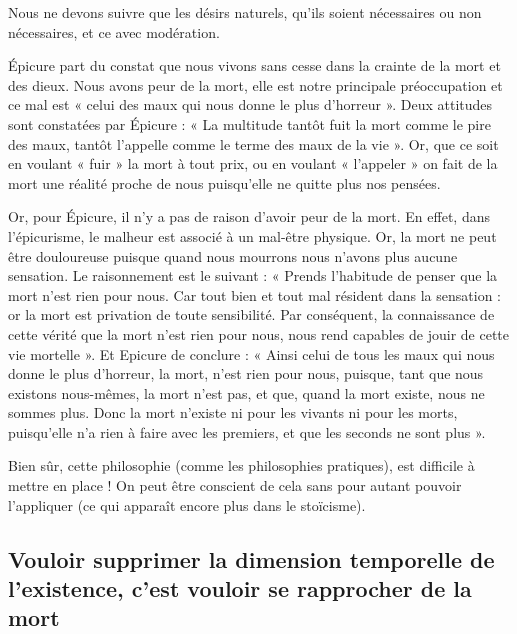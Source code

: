\documentclass[french]{book}
\theoremstyle{definition}
\begin{document}
Nous ne devons suivre que les désirs naturels, qu’ils soient nécessaires ou non nécessaires, et ce avec modération.

Épicure part du constat que nous vivons sans cesse dans la crainte de la mort et des dieux. Nous avons peur de la mort, elle est notre principale préoccupation et ce mal est « celui des maux qui nous donne le plus d’horreur ». Deux attitudes sont constatées par Épicure : « La multitude tantôt fuit la mort comme le pire des maux, tantôt l’appelle comme le terme des maux de la vie ». Or, que ce soit en voulant « fuir » la mort à tout prix, ou en voulant « l’appeler » on fait de la mort une réalité proche de nous puisqu’elle ne quitte plus nos pensées.

Or, pour Épicure, il n’y a pas de raison d’avoir peur de la mort. En effet, dans l’épicurisme, le malheur est associé à un mal-être physique. Or, la mort ne peut être douloureuse puisque quand nous mourrons nous n’avons plus aucune sensation. Le raisonnement est le suivant : « Prends l’habitude de penser que la mort n’est rien pour nous. Car tout bien et tout mal résident dans la sensation : or la mort est privation de toute sensibilité. Par conséquent, la connaissance de cette vérité que la mort n’est rien pour nous, nous rend capables de jouir de cette vie mortelle ». Et Epicure de conclure : « Ainsi celui de tous les maux qui nous donne le plus d’horreur, la mort, n’est rien pour nous, puisque, tant que nous existons nous-mêmes, la mort n’est pas, et que, quand la mort existe, nous ne sommes plus. Donc la mort n’existe ni pour les vivants ni pour les morts, puisqu’elle n’a rien à faire avec les premiers, et que les seconds ne sont plus ».

Bien sûr, cette philosophie (comme les philosophies pratiques), est difficile à mettre en place ! On peut être conscient de cela sans pour autant pouvoir l’appliquer (ce qui apparaît encore plus dans le stoïcisme).

\subsection{Vouloir supprimer la dimension temporelle de l’existence, c’est vouloir se rapprocher de la mort}
\end{document}
